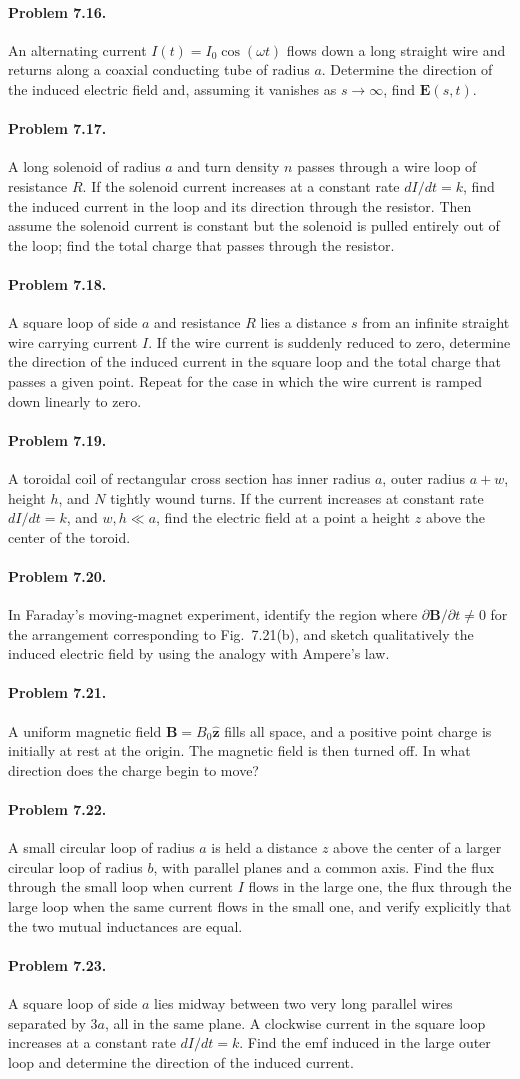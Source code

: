 \documentclass{aa}
\newcommand{\problemstatement}[2]{%
\paragraph{Problem #1.}#2\par\medskip
}
\begin{document}
\problemstatement{7.16}{An alternating current \(I(t)=I_0\cos(\omega t)\) flows down a long straight wire and returns along a coaxial conducting tube of radius \(a\). Determine the direction of the induced electric field and, assuming it vanishes as \(s\to\infty\), find \( \mathbf E(s,t)\).}
\problemstatement{7.17}{A long solenoid of radius \(a\) and turn density \(n\) passes through a wire loop of resistance \(R\). If the solenoid current increases at a constant rate \(dI/dt=k\), find the induced current in the loop and its direction through the resistor. Then assume the solenoid current is constant but the solenoid is pulled entirely out of the loop; find the total charge that passes through the resistor.}
\problemstatement{7.18}{A square loop of side \(a\) and resistance \(R\) lies a distance \(s\) from an infinite straight wire carrying current \(I\). If the wire current is suddenly reduced to zero, determine the direction of the induced current in the square loop and the total charge that passes a given point. Repeat for the case in which the wire current is ramped down linearly to zero.}
\problemstatement{7.19}{A toroidal coil of rectangular cross section has inner radius \(a\), outer radius \(a+w\), height \(h\), and \(N\) tightly wound turns. If the current increases at constant rate \(dI/dt=k\), and \(w,h\ll a\), find the electric field at a point a height \(z\) above the center of the toroid.}
\problemstatement{7.20}{In Faraday's moving-magnet experiment, identify the region where \(\partial \mathbf B/\partial t\neq 0\) for the arrangement corresponding to Fig.~7.21(b), and sketch qualitatively the induced electric field by using the analogy with Ampere's law.}
\problemstatement{7.21}{A uniform magnetic field \( \mathbf B=B_0\hat{\mathbf z}\) fills all space, and a positive point charge is initially at rest at the origin. The magnetic field is then turned off. In what direction does the charge begin to move?}
\problemstatement{7.22}{A small circular loop of radius \(a\) is held a distance \(z\) above the center of a larger circular loop of radius \(b\), with parallel planes and a common axis. Find the flux through the small loop when current \(I\) flows in the large one, the flux through the large loop when the same current flows in the small one, and verify explicitly that the two mutual inductances are equal.}
\problemstatement{7.23}{A square loop of side \(a\) lies midway between two very long parallel wires separated by \(3a\), all in the same plane. A clockwise current in the square loop increases at a constant rate \(dI/dt=k\). Find the emf induced in the large outer loop and determine the direction of the induced current.}
\end{document}
